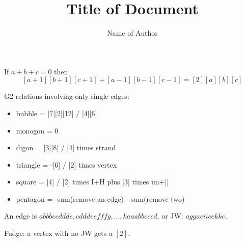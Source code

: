 \documentclass{article}
\title{Title of Document}
\author{Name of Author}
\begin{document}
\maketitle
If $a+b+c = 0$ then
$$[a+1][b+1][c+1] + [a-1][b-1][c-1] = [2][a][b][c]$$

G2 relations involving only single edges:

\begin{itemize}
\item bubble = [7][2][12] / [4][6]
\item monogon = 0
\item digon = [3][8] / [4] times strand
\item triangle = -[6] / [2] times vertex
\item square = [4] / [2] times I+H plus [3] times un+||
\item pentagon = -sum(remove an edge) - sum(remove two)
\end{itemize}

An edge is 
$abbbccddde, cdddeefffg, \dots, kaaabbcccd$,
or JW: $agga ciic ekke$.

Fudge:
a vertex with no JW gets a $[2]$.
\end{document}
